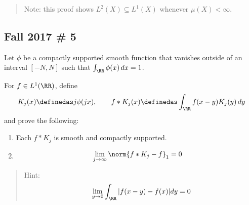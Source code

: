 \begin{solution}
\begin{quote}
Note: this proof shows \(L^2(X) \subseteq L^1(X)\) whenever
\(\mu(X) < \infty\).
\end{quote}

\end{solution}

\hypertarget{fall-2017-5}{%
\subsection{Fall 2017 \# 5}\label{fall-2017-5}}

Let \(\phi\) be a compactly supported smooth function that vanishes
outside of an interval \([-N, N]\) such that
\(\int _{\RR} \phi(x) \, dx = 1\).

For \(f\in L^1(\RR)\), define
\begin{align*}
K_{j}(x) \definedas j \phi(j x), 
\qquad 
f \ast K_{j}(x) \definedas \int_{\RR} f(x-y) K_{j}(y) \, dy
\end{align*} and prove the following:

\begin{enumerate}
\def\labelenumi{\arabic{enumi}.}
\item
  Each \(f\ast K_j\) is smooth and compactly supported.
\item

  \begin{align*}
  \lim _{j \to \infty} \norm{f * K_{j}-f}_{1} = 0
  \end{align*}
\end{enumerate}

\begin{quote}
Hint:
\begin{align*}
\lim _{y \to 0} \int _{\RR} |f(x-y)-f(x)| dy = 0
\end{align*}
\end{quote}

